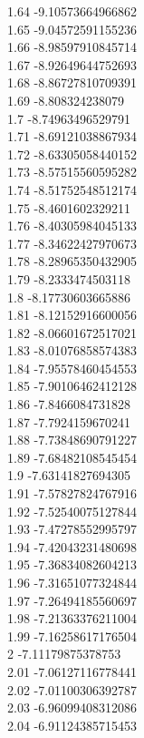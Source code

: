 {1.64	-9.10573664966862\\
1.65	-9.04572591155236\\
1.66	-8.98597910845714\\
1.67	-8.92649644752693\\
1.68	-8.86727810709391\\
1.69	-8.808324238079\\
1.7	-8.74963496529791\\
1.71	-8.69121038867934\\
1.72	-8.63305058440152\\
1.73	-8.57515560595282\\
1.74	-8.51752548512174\\
1.75	-8.4601602329211\\
1.76	-8.40305984045133\\
1.77	-8.34622427970673\\
1.78	-8.28965350432905\\
1.79	-8.2333474503118\\
1.8	-8.17730603665886\\
1.81	-8.12152916600056\\
1.82	-8.06601672517021\\
1.83	-8.01076858574383\\
1.84	-7.95578460454553\\
1.85	-7.90106462412128\\
1.86	-7.8466084731828\\
1.87	-7.7924159670241\\
1.88	-7.73848690791227\\
1.89	-7.68482108545454\\
1.9	-7.63141827694305\\
1.91	-7.57827824767916\\
1.92	-7.52540075127844\\
1.93	-7.47278552995797\\
1.94	-7.42043231480698\\
1.95	-7.36834082604213\\
1.96	-7.31651077324844\\
1.97	-7.26494185560697\\
1.98	-7.21363376211004\\
1.99	-7.16258617176504\\
2	-7.11179875378753\\
2.01	-7.06127116778441\\
2.02	-7.01100306392787\\
2.03	-6.96099408312086\\
2.04	-6.91124385715453\\
}
